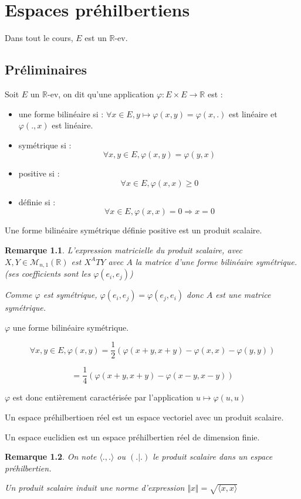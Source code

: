 \documentclass[a4paper,12pt]{book}
\newcommand{\Def}[2]{\begin{tcolorbox}[sharp corners, colback=white,colframe=blue!90!black!75, title=Définition : #1]#2\end{tcolorbox}}
\newcommand{\Prop}[2]{\begin{tcolorbox}[sharp corners, colback=white,colframe=red!90!black!75, title=Proposition : #1]#2\end{tcolorbox}}
\newtheorem{Rem}{Remarque}[section]
\def\R{\mathbb{R}}
\begin{document}
\chapter{Espaces préhilbertiens}
Dans tout le cours, $E$ est un $\R$-ev.
\section{Préliminaires}
\Def{}{Soit $E$ un $\R$-ev, on dit qu'une application $\varphi:E\times E\to\R$ est :\begin{itemize}
\item une forme bilinéaire si : $\forall x\in E, y\mapsto \varphi(x,y)=\varphi(x, .)$ est linéaire et $\varphi(., x)$ est linéaire.
\item symétrique si : $$\forall x,y\in E, \varphi(x,y)=\varphi(y,x)$$
\item positive si : $$\forall x\in E, \varphi(x, x)\geq 0$$
\item définie si : $$\forall x\in E, \varphi(x, x)=0\Rightarrow x=0$$
\end{itemize}}
\Def{Produit scalaire}{Une forme bilinéaire symétrique définie positive est un produit scalaire.}
\begin{Rem}
L'expression matricielle du produit scalaire, avec $X, Y\in\mathcal{M}_{n,1}(\R)$ est $X^ATY$ avec $A$ la matrice d'une forme bilinéaire symétrique. (ses coefficients sont les $\varphi(e_i, e_j)$)
\par Comme $\varphi$ est symétrique, $\varphi(e_i, e_j)=\varphi(e_j, e_i)$ donc $A$ est une matrice symétrique.
\end{Rem}
\Prop{Identités polaires}{$\varphi$ une forme bilinéaire symétrique.
\par $$\forall x, y\in E, \varphi(x, y) =\frac{1}{2}(\varphi(x+y, x+y) - \varphi(x, x) - \varphi(y,y))$$
\par $$ = \frac{1}{4}(\varphi(x+y, x+y) - \varphi(x-y, x-y))$$
\par $\varphi$ est donc entièrement caractérisée par l'application $u\mapsto \varphi(u,u)$}
\Def{}{Un espace préhilbertioen réel est un espace vectoriel avec un produit scalaire.
\par Un espace euclidien est un espace préhilbertien réel de dimension finie.}
\begin{Rem}
On note $\langle.,.\rangle$ ou $(.\vert.)$ le produit scalaire dans un espace préhilbertien.
\par Un produit scalaire induit une norme d'expression $\Vert x\Vert= \sqrt{\langle x, x\rangle}$
\end{Rem}
\end{document}
